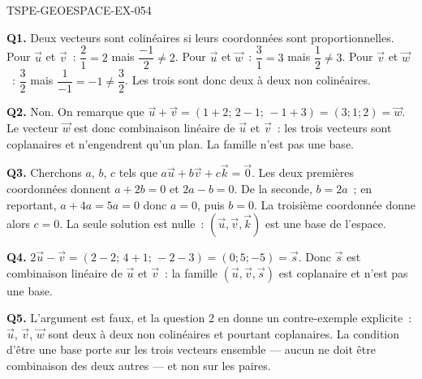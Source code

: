 \begin{corrige}{TSPE-GEOESPACE-EX-054}

\textbf{Q1.} Deux vecteurs sont colinéaires si leurs coordonnées sont
proportionnelles. Pour $\vec{u}$ et $\vec{v}$~: $\dfrac{2}{1}=2$ mais
$\dfrac{-1}{2}\neq2$. Pour $\vec{u}$ et $\vec{w}$~: $\dfrac{3}{1}=3$ mais
$\dfrac{1}{2}\neq3$. Pour $\vec{v}$ et $\vec{w}$~: $\dfrac{3}{2}$ mais
$\dfrac{1}{-1}=-1\neq\dfrac32$. Les trois sont donc deux à deux non
colinéaires.

\textbf{Q2.} Non. On remarque que
$\vec{u}+\vec{v}=(1+2;\,2-1;\,-1+3)=(3;1;2)=\vec{w}$.
Le vecteur $\vec{w}$ est donc combinaison linéaire de $\vec{u}$ et $\vec{v}$~:
les trois vecteurs sont coplanaires et n'engendrent qu'un plan. La famille
n'est pas une base.

\textbf{Q3.} Cherchons $a$, $b$, $c$ tels que
$a\vec{u}+b\vec{v}+c\vec{k}=\vec{0}$. Les deux premières coordonnées donnent
$a+2b=0$ et $2a-b=0$. De la seconde, $b=2a$~; en reportant, $a+4a=5a=0$ donc
$a=0$, puis $b=0$. La troisième coordonnée donne alors $c=0$. La seule
solution est nulle~: $(\vec{u},\vec{v},\vec{k})$ est une base de l'espace.

\textbf{Q4.} $2\vec{u}-\vec{v}=(2-2;\,4+1;\,-2-3)=(0;5;-5)=\vec{s}$. Donc
$\vec{s}$ est combinaison linéaire de $\vec{u}$ et $\vec{v}$~: la famille
$(\vec{u},\vec{v},\vec{s})$ est coplanaire et n'est pas une base.

\textbf{Q5.} L'argument est faux, et la question 2 en donne un contre-exemple
explicite~: $\vec{u}$, $\vec{v}$, $\vec{w}$ sont deux à deux non colinéaires
et pourtant coplanaires. La condition d'être une base porte sur les trois
vecteurs ensemble --- aucun ne doit être combinaison des deux autres --- et
non sur les paires.

\end{corrige}

%
%
%
%
%
